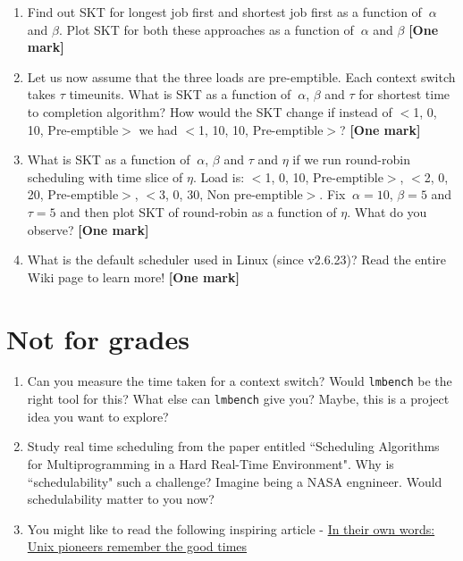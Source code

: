 \documentclass[]{article}
\begin{document}
\begin{enumerate}
\begin{enumerate}
	\item Find out SKT for longest job first and shortest job first as a function of $~\alpha $ and $\beta$. Plot SKT for both these approaches as a function of $~\alpha $ and $\beta$  \textbf{[One mark]} 
	\item Let us now assume that the three loads are pre-emptible. Each context switch takes $\tau$ timeunits. What is SKT as a function of  $~\alpha$, $\beta$ and $\tau$ for shortest time to completion algorithm? How would the SKT change if instead of $<$1, 0, 10, Pre-emptible$>$ we had 	$<$1, 10, 10, Pre-emptible$>$? \textbf{[One mark]} 
	\item What is SKT as a function of $~\alpha$, $\beta$ and $\tau$ and $\eta$ if we run round-robin scheduling with time slice of $\eta$. Load is: $<$1, 0, 10, Pre-emptible$>$, $<$2, 0, 20, Pre-emptible$>$, $<$3, 0, 30, Non pre-emptible$>$. Fix  $~\alpha = 10$, $\beta = 5$ and $\tau=5$ and then plot SKT of round-robin as a function of $\eta$. What do you observe? \textbf{[One mark]} 
	\item What is the default scheduler used in Linux (since v2.6.23)? Read the entire Wiki page to learn more! \textbf{[One mark]} 
\end{enumerate}
\end{enumerate}
	
	\section*{Not for grades}
	\begin{enumerate}
	
			\item Can you measure the time taken for a context switch? Would \texttt{lmbench} be the right tool for this? What else can \texttt{lmbench} give you? Maybe, this is a project idea you want to explore?
			\item Study real time scheduling from the paper entitled ``Scheduling Algorithms for Multiprogramming in a Hard Real-Time
			Environment". Why is ``schedulability" such a challenge? Imagine being a NASA engnineer. Would schedulability matter to you now?
			\item You might like to read the following inspiring article - \href{https://www.networkworld.com/article/2168942/servers/in-their-own-words--unix-pioneers-remember-the-good-times.html}{In their own words: Unix pioneers remember the good times}
	\end{enumerate}
\end{document}
